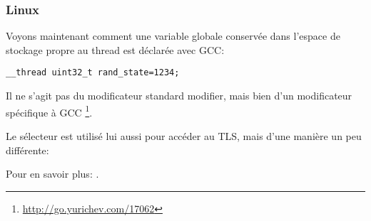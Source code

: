 ﻿\subsubsection{Linux}

Voyons maintenant comment une variable globale conservée dans l'espace de stockage propre au thread 
est déclarée avec GCC:

\begin{lstlisting}
__thread uint32_t rand_state=1234;
\end{lstlisting}

Il ne s'agit pas du modificateur standard \CCpp modifier, mais bien d'un modificateur spécifique à 
GCC
\footnote{\url{http://go.yurichev.com/17062}}.


Le sélecteur  est utilisé lui aussi pour accéder au \ac{TLS}, mais d'une manière un peu 
différente:




Pour en savoir plus: \DrepperTLS.

